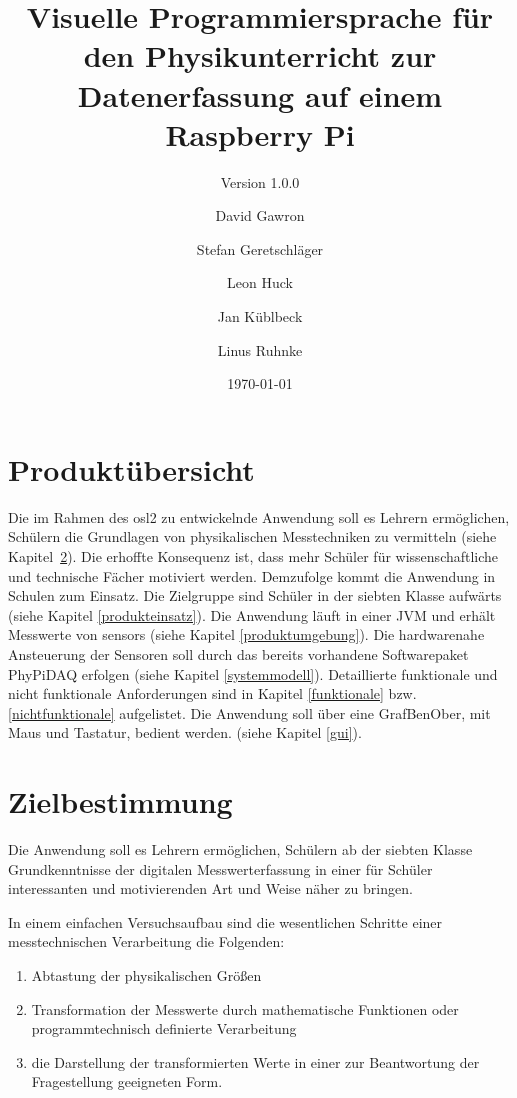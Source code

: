 \documentclass[parskip=full]{scrartcl}
\title{Visuelle Programmiersprache für den Physikunterricht zur Datenerfassung auf einem Raspberry Pi}
\subtitle{Version 1.0.0}
\author{David Gawron \and Stefan Geretschläger \and Leon Huck \and Jan Küblbeck \and Linus Ruhnke}
\date{\today}
\begin{document}
\maketitle

\clearpage
\tableofcontents 					%

\clearpage
\section{Produktübersicht} %

Die im Rahmen des \gls{osl2} zu entwickelnde Anwendung soll es Lehrern ermöglichen, Schülern die Grundlagen von physikalischen Messtechniken zu vermitteln (siehe Kapitel~\ref{zielbestimmung}). Die erhoffte Konsequenz ist, dass mehr Schüler für wissenschaftliche und technische Fächer motiviert werden.
Demzufolge kommt die Anwendung in Schulen zum Einsatz. 
Die Zielgruppe sind Schüler in der siebten Klasse aufwärts (siehe Kapitel \ref{produkteinsatz}).
Die Anwendung läuft in einer \gls{JVM} und erhält Messwerte von \glspl{sensor} (siehe Kapitel \ref{produktumgebung}). 
Die hardwarenahe Ansteuerung der Sensoren soll durch das bereits vorhandene Softwarepaket \gls{PhyPiDAQ} erfolgen (siehe Kapitel \ref{systemmodell}).
Detaillierte funktionale und nicht funktionale Anforderungen sind in Kapitel \ref{funktionale} bzw. \ref{nichtfunktionale} aufgelistet.
Die Anwendung soll über eine \gls{GrafBenOber}, mit Maus und Tastatur, bedient werden. (siehe Kapitel \ref{gui}).

\clearpage
\section{Zielbestimmung}\label{zielbestimmung}

Die Anwendung soll es Lehrern ermöglichen, Schülern ab der siebten Klasse Grundkenntnisse der digitalen Messwerterfassung in einer für Schüler interessanten und motivierenden Art und Weise näher zu bringen. 

In einem einfachen Versuchsaufbau sind die wesentlichen Schritte einer messtechnischen Verarbeitung die Folgenden: 

\begin{enumerate}
	\item Abtastung der physikalischen Größen
	
	\item Transformation der Messwerte durch mathematische Funktionen oder programmtechnisch definierte Verarbeitung
	
	\item die Darstellung der transformierten Werte in einer zur Beantwortung der Fragestellung geeigneten Form.
	
\end{enumerate}
\end{document}
